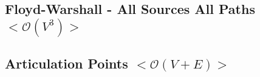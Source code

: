 \documentclass[10pt, a4paper, twoside, notitlepage]{article}
\begin{document}


\subsection{Floyd-Warshall - All Sources All Paths $<\mathcal{O}(V^{3})>$}



\newpage

\subsection{Articulation Points $<\mathcal{O}(V+E)>$}



\newpage
\end{document}
